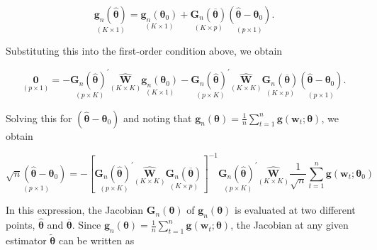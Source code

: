 \documentclass[10pt]{article}
\begin{document}
\begin{equation*}
\underset{(K \times 1)}{\mathbf{g}_{n}(\hat{\boldsymbol{\theta}})}=\underset{(K \times 1)}{\mathbf{g}_{n}\left(\boldsymbol{\theta}_{0}\right)}+\underset{(K \times p)}{\mathbf{G}_{n}(\overline{\boldsymbol{\theta}})} \underset{(p \times 1)}{\left(\hat{\boldsymbol{\theta}}-\boldsymbol{\theta}_{0}\right)} . \tag{7.3.30}
\end{equation*}


Substituting this into the first-order condition above, we obtain


\begin{equation*}
\underset{(p \times 1)}{\mathbf{0}}=-\underset{(p \times K)}{\mathbf{G}_{n}(\hat{\boldsymbol{\theta}})^{\prime}} \underset{(K \times K)}{\widehat{\mathbf{W}}} \underset{(K \times 1)}{\mathbf{g}_{n}\left(\boldsymbol{\theta}_{0}\right)}-\underset{(p \times K)}{\mathbf{G}_{n}(\hat{\boldsymbol{\theta}})^{\prime}} \underset{(K \times K)}{\widehat{\mathbf{W}}} \underset{(K \times p)}{\mathbf{G}_{n}(\overline{\boldsymbol{\theta}})} \underset{(p \times 1)}{\left(\hat{\boldsymbol{\theta}}-\boldsymbol{\theta}_{0}\right)} . \tag{7.3.31}
\end{equation*}


Solving this for $\left(\hat{\boldsymbol{\theta}}-\boldsymbol{\theta}_{0}\right)$ and noting that $\mathbf{g}_{n}(\boldsymbol{\theta})=\frac{1}{n} \sum_{t=1}^{n} \mathbf{g}\left(\mathbf{w}_{t} ; \boldsymbol{\theta}\right)$, we obtain


\begin{equation*}
\underset{(p \times 1)}{\sqrt{n}\left(\hat{\boldsymbol{\theta}}-\boldsymbol{\theta}_{0}\right)}=-\left[\underset{(p \times K)}{\mathbf{G}_{n}(\hat{\boldsymbol{\theta}})^{\prime}} \underset{(K \times K)}{\widehat{\mathbf{W}}} \underset{(K \times p)}{\mathbf{G}_{n}(\overline{\boldsymbol{\theta}})}\right]^{-1} \underset{(p \times K)}{\mathbf{G}_{n}(\hat{\boldsymbol{\theta}})^{\prime}} \underset{(K \times K)}{\widehat{\mathbf{W}}} \frac{1}{\sqrt{n}} \sum_{t=1}^{n} \mathbf{g}\left(\mathbf{w}_{t} ; \boldsymbol{\theta}_{0}\right) \tag{7.3.32}
\end{equation*}


In this expression, the Jacobian $\mathbf{G}_{n}(\boldsymbol{\theta})$ of $\mathbf{g}_{n}(\boldsymbol{\theta})$ is evaluated at two different points, $\hat{\boldsymbol{\theta}}$ and $\overline{\boldsymbol{\theta}}$. Since $\mathbf{g}_{n}(\boldsymbol{\theta})=\frac{1}{n} \sum_{t=1}^{n} \mathbf{g}\left(\mathbf{w}_{t} ; \boldsymbol{\theta}\right)$, the Jacobian at any given estimator $\tilde{\boldsymbol{\theta}}$ can be written as
\end{document}
